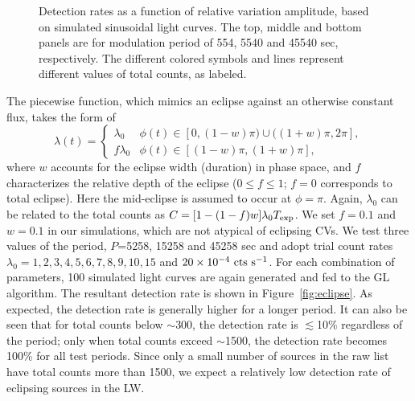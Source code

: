 \documentclass[fleqn,usenatbib]{mnras}
\begin{document}
\begin{figure}
\begin{minipage}[b]{0.45\textwidth}
\end{minipage}
\caption{Detection rates as a function of relative variation amplitude, based on simulated sinusoidal light curves. The top, middle and bottom panels are for modulation period of 554, 5540 and 45540 sec, respectively. The different colored symbols and lines represent different values of total counts, as labeled.
\label{fig:detection}}
\end{figure}

The piecewise function, which mimics an eclipse against an otherwise constant flux, takes the form of
\begin{equation}
\lambda(t)=
\begin{cases}
\lambda_0 & \text{$\phi(t) \in[0,(1-w)\pi)\cup ((1+w)\pi,2\pi]$},\\
f\lambda_0 & \text{$\phi(t) \in[(1-w)\pi,(1+w)\pi]$},
\end{cases}	
\end{equation}
where $w$ accounts for the eclipse width (duration) in phase space, and $f$ characterizes the relative depth of the eclipse ($0\leq f \leq 1$; $f = 0$ corresponds to total eclipse). Here the mid-eclipse is assumed to occur at $\phi = \pi$. 
Again, $\lambda_0$ can be related to the total counts as $C=[1-(1-f)w]\lambda_0T_{\rm exp}$.
We set $f=0.1$ and $w=0.1$ in our simulations, which are not atypical of eclipsing CVs. 
We test three values of the period, $P$=5258, 15258 and 45258 sec and adopt trial count rates $\lambda_0 = 1, 2, 3, 4, 5, 6, 7, 8, 9, 10, 15$ and $20\times10^{-4}{\rm~cts~s^{-1}}$.
For each combination of parameters, 100 simulated light curves are again generated and fed to the GL algorithm. 
The resultant detection rate is shown in Figure~\ref{fig:eclipse}. 
As expected, the detection rate is generally higher for a longer period.
It can also be seen that for total counts below $\sim$300, the detection rate is $\lesssim$10\% regardless of the period; only when total counts exceed $\sim$1500, the detection rate becomes 100\% for all test periods. 
Since only a small number of sources in the raw list have total counts more than 1500, we expect a relatively low detection rate of eclipsing sources in the LW.  
 
\end{document}
